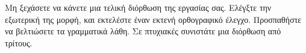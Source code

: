 Μη ξεχάσετε να κάνετε μια τελική διόρθωση της εργασίας σας. Ελέγξτε την εξωτερική της μορφή, και εκτελέστε έναν εκτενή ορθογραφικό έλεγχο. Προσπαθήστε να βελτιώσετε τα γραμματικά λάθη. Σε πτυχιακές συνιστάτε μια διόρθωση από τρίτους.
